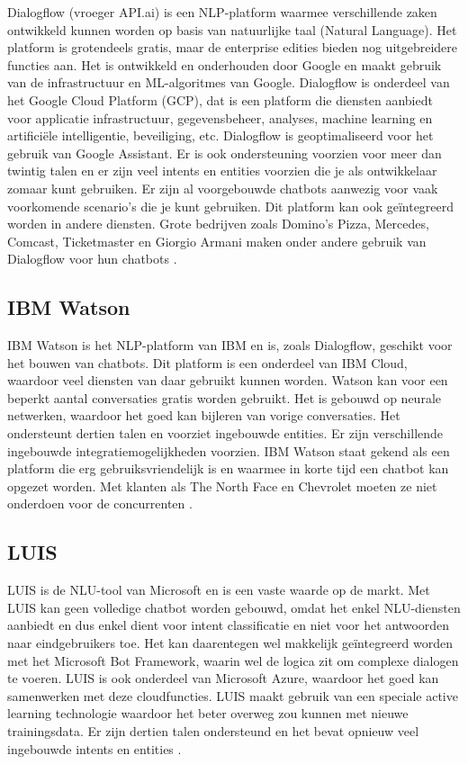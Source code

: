 Dialogflow (vroeger API.ai) is een NLP-platform waarmee verschillende zaken ontwikkeld kunnen worden op basis van natuurlijke taal (Natural Language). Het platform is grotendeels gratis, maar de enterprise edities bieden nog uitgebreidere functies aan. Het is ontwikkeld en onderhouden door Google en maakt gebruik van de infrastructuur en ML-algoritmes van Google. Dialogflow is onderdeel van het Google Cloud Platform (GCP), dat is een platform die diensten aanbiedt voor applicatie infrastructuur, gegevensbeheer, analyses, machine learning en artificiële intelligentie, beveiliging, etc. Dialogflow is geoptimaliseerd voor het gebruik van Google Assistant. Er is ook ondersteuning voorzien voor meer dan twintig talen en er zijn veel intents en entities voorzien die je als ontwikkelaar zomaar kunt gebruiken. Er zijn al voorgebouwde chatbots aanwezig voor vaak voorkomende scenario’s die je kunt gebruiken. Dit platform kan ook geïntegreerd worden in andere diensten. Grote bedrijven zoals Domino’s Pizza, Mercedes, Comcast, Ticketmaster en Giorgio Armani maken onder andere gebruik van Dialogflow voor hun chatbots \autocite{Dialogflow2020}. 

\subsection{IBM Watson}
\label{subsec:nlp-platformen-ibm-watson}

IBM Watson is het NLP-platform van IBM en is, zoals Dialogflow, geschikt voor het bouwen van chatbots. Dit platform is een onderdeel van IBM Cloud, waardoor veel diensten van daar gebruikt kunnen worden. Watson kan voor een beperkt aantal conversaties gratis worden gebruikt. Het is gebouwd op neurale netwerken, waardoor het goed kan bijleren van vorige conversaties. Het ondersteunt dertien talen en voorziet ingebouwde entities. Er zijn verschillende ingebouwde integratiemogelijkheden voorzien. IBM Watson staat gekend als een platform die erg gebruiksvriendelijk is en waarmee in korte tijd een chatbot kan opgezet worden. Met klanten als The North Face en Chevrolet moeten ze niet onderdoen voor de concurrenten \autocite{IBM2020}.


\subsection{LUIS}
\label{subsec:nlp-platformen-luis} 

LUIS is de NLU-tool van Microsoft en is een vaste waarde op de markt. Met LUIS kan geen volledige chatbot worden gebouwd, omdat het enkel NLU-diensten aanbiedt en dus enkel dient voor intent classificatie en niet voor het antwoorden naar eindgebruikers toe.  Het kan daarentegen wel makkelijk geïntegreerd worden met het Microsoft Bot Framework, waarin wel de logica zit om complexe dialogen te voeren. LUIS is ook onderdeel van Microsoft Azure, waardoor het  goed kan samenwerken met deze cloudfuncties. LUIS maakt gebruik van een speciale active learning technologie waardoor het beter overweg zou kunnen met nieuwe trainingsdata. Er zijn dertien talen ondersteund en het bevat opnieuw veel ingebouwde intents en entities \autocite{LUIS2020}.

